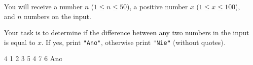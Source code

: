 




You will receive a number $n$ ($1\leq n \leq 50$), a positive number $x$ ($1 \leq x \leq 100$), and $n$ numbers on the input.

Your task is to determine if the difference between any two numbers in the input is equal to $x$. If yes, print \texttt{"Ano"}, otherwise print \texttt{"Nie"} (without quotes).

 4
1 2 3 5 4 7 6
\vystup
Ano
\koniec


